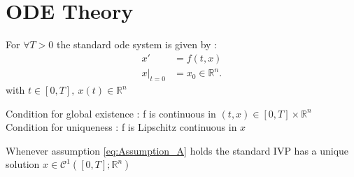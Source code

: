 \section{ODE Theory}
\begin{definition}
 For $\forall  T > 0 $  the standard ode system is given by : 
 \begin{align*}
  x' &= f(t,x) \\
  x \vert_{t=0} &=  x_0 \in \mathbb{R}^{n} 
 .\end{align*}
 with $t \in  [0,T] ,\ x(t) \in  \mathbb{R}^{n} $
\end{definition}
\begin{assumption}[A]\label{eq:Assumption_A}
  Condition for global existence : f is continuous in $(t,x) \in  [0,T] \times \mathbb{R}^{n} $ \\ 
  Condition for uniqueness : f is Lipschitz continuous in $x$  
\end{assumption}
\begin{theorem}[]
  Whenever assumption \ref{eq:Assumption_A} holds the standard IVP has a unique solution $x \in  \mathcal{C}^{1}([0,T] ; \mathbb{R}^{n} ) $
\end{theorem}
